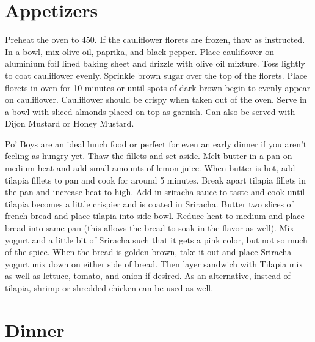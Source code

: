 \documentclass[oneside]{recipe}
\begin{document}
\chapter{Appetizers}
Preheat the oven to 450. If the cauliflower florets are frozen, thaw as instructed. In a bowl, mix olive oil, paprika, and black pepper. Place cauliflower on aluminium foil lined baking sheet and drizzle with olive oil mixture. Toss lightly to coat cauliflower evenly. Sprinkle brown sugar over the top of the florets. Place florets in oven for 10 minutes or until spots of dark brown begin to evenly appear on cauliflower. Cauliflower should be crispy when taken out of the oven. Serve in a bowl with sliced almonds placed on top as garnish. Can also be served with Dijon Mustard or Honey Mustard.


Po' Boys are an ideal lunch food or perfect for even an early dinner if you aren't feeling as hungry yet. Thaw the fillets and set aside. Melt butter in a pan on medium heat and add small amounts of lemon juice. When butter is hot, add tilapia fillets to pan and cook for around 5 minutes. Break apart tilapia fillets in the pan and increase heat to high. Add in sriracha sauce to taste and cook until tilapia becomes a little crispier and is coated in Sriracha. Butter two slices of french bread and place tilapia into side bowl. Reduce heat to medium and place bread into same pan (this allows the bread to soak in the flavor as well). Mix yogurt and a little bit of Sriracha such that it gets a pink color, but not so much of the spice. When the bread is golden brown, take it out and place Sriracha yogurt mix down on either side of bread. Then layer sandwich with Tilapia mix as well as lettuce, tomato, and onion if desired. As an alternative, instead of tilapia, shrimp or shredded chicken can be used as well. 

\chapter{Dinner}
\end{document}
